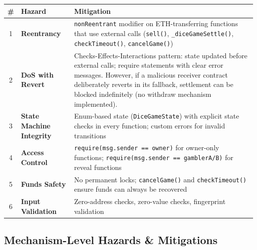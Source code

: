 \documentclass[10pt,a4paper]{article}
\begin{document}
\begin{table}[h]
\centering
\begin{tabularx}{\textwidth}{c X X}
\toprule
\textbf{\#} & \textbf{Hazard} & \textbf{Mitigation} \\
\midrule
1 & \textbf{Reentrancy} & \texttt{nonReentrant} modifier on ETH-transferring functions that use external calls (\texttt{sell()}, \texttt{\_diceGameSettle()}, \texttt{checkTimeout()}, \texttt{cancelGame()}) \\
2 & \textbf{DoS with Revert} & Checks-Effects-Interactions pattern: state updated before external calls; require statements with clear error messages. However, if a malicious receiver contract deliberately reverts in its fallback, settlement can be blocked indefinitely (no withdraw mechanism implemented). \\
3 & \textbf{State Machine Integrity} & Enum-based state (\texttt{DiceGameState}) with explicit state checks in every function; custom errors for invalid transitions \\
4 & \textbf{Access Control} & \texttt{require(msg.sender == owner)} for owner-only functions; \texttt{require(msg.sender == gamblerA/B)} for reveal functions \\
5 & \textbf{Funds Safety} & No permanent locks; \texttt{cancelGame()} and \texttt{checkTimeout()} ensure funds can always be recovered \\
6 & \textbf{Input Validation} & Zero-address checks, zero-value checks, fingerprint validation \\
\bottomrule
\end{tabularx}
\end{table}

\subsection*{Mechanism-Level Hazards \& Mitigations}
\end{document}
